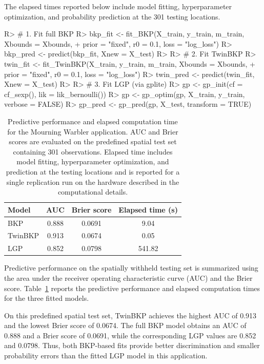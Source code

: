 \documentclass[article, shortnames]{jss}
\begin{document}
The elapsed times reported below include model fitting, hyperparameter optimization, and probability prediction at the 301 testing locations.

\begin{CodeChunk}
\begin{CodeInput}
R> # 1. Fit full BKP
R> bkp_fit <- fit_BKP(X_train, y_train, m_train, Xbounds = Xbounds,
+                     prior = "fixed", r0 = 0.1, loss = "log_loss")
R> bkp_pred <- predict(bkp_fit, Xnew = X_test)
R>
R> # 2. Fit TwinBKP
R> twin_fit <- fit_TwinBKP(X_train, y_train, m_train, Xbounds = Xbounds,
+                          prior = "fixed", r0 = 0.1, loss = "log_loss")
R> twin_pred <- predict(twin_fit, Xnew = X_test)
R>
R> # 3. Fit LGP (via gplite)
R> gp <- gp_init(cf = cf_sexp(), lik = lik_bernoulli())
R> gp <- gp_optim(gp, X_train, y_train, verbose = FALSE)
R> gp_pred <- gp_pred(gp, X_test, transform = TRUE)
\end{CodeInput}
\end{CodeChunk}

\begin{table}[!t]
	\centering
	\begin{tabular}{lccc}
		\toprule
		Model & AUC & Brier score & Elapsed time (s) \\
		\midrule
		BKP     & 0.888 & 0.0691 & 9.04 \\
		TwinBKP & 0.913 & 0.0674 & 0.05 \\
		LGP     & 0.852 & 0.0798 & 541.82 \\
		\bottomrule
	\end{tabular}
	\caption{Predictive performance and elapsed computation time for the Mourning Warbler application.
	AUC and Brier scores are evaluated on the predefined spatial test set containing 301 observations.
	Elapsed time includes model fitting, hyperparameter optimization, and prediction at the testing locations and is reported for a single replication run on the hardware described in the computational details.}
	\label{tab:model_comparison}
\end{table}

Predictive performance on the spatially withheld testing set is summarized using the area under the receiver operating characteristic curve (AUC) and the Brier score.
Table~\ref{tab:model_comparison} reports the predictive performance and elapsed computation times for the three fitted models.

On this predefined spatial test set, TwinBKP achieves the highest AUC of 0.913 and the lowest Brier score of 0.0674.
The full BKP model obtains an AUC of 0.888 and a Brier score of 0.0691, while the corresponding LGP values are 0.852 and 0.0798.
Thus, both BKP-based fits provide better discrimination and smaller probability errors than the fitted LGP model in this application.
\end{document}
